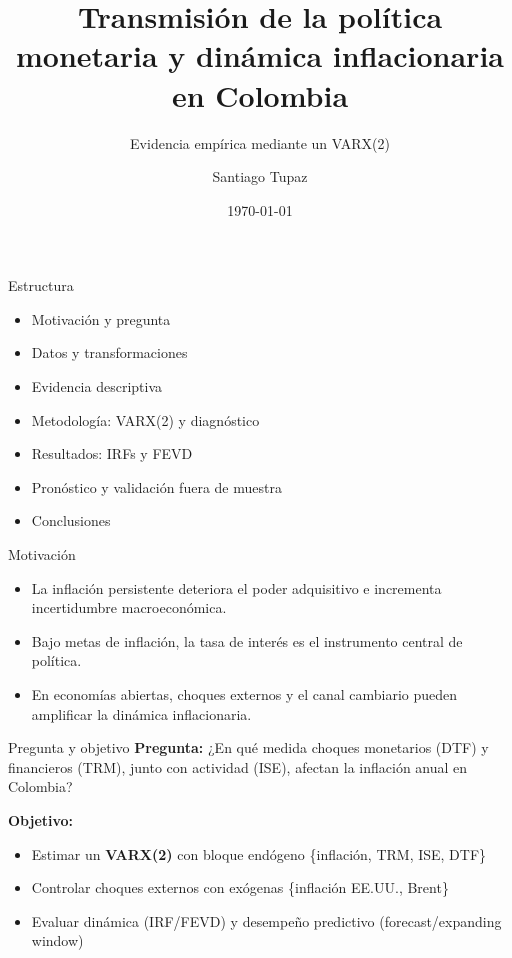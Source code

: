 \documentclass[aspectratio=169,11pt]{beamer}
\title{Transmisión de la política monetaria y dinámica inflacionaria en Colombia}
\subtitle{Evidencia empírica mediante un VARX(2)}
\author{Santiago Tupaz}
\date{\today}
\begin{document}
\begin{frame}
  \titlepage
\end{frame}

\begin{frame}{Estructura}
\begin{itemize}
  \item Motivación y pregunta
  \item Datos y transformaciones
  \item Evidencia descriptiva
  \item Metodología: VARX(2) y diagnóstico
  \item Resultados: IRFs y FEVD
  \item Pronóstico y validación fuera de muestra
  \item Conclusiones
\end{itemize}
\end{frame}

\begin{frame}{Motivación}
\begin{itemize}
  \item La inflación persistente deteriora el poder adquisitivo e incrementa incertidumbre macroeconómica.
  \item Bajo metas de inflación, la tasa de interés es el instrumento central de política.
  \item En economías abiertas, choques externos y el canal cambiario pueden amplificar la dinámica inflacionaria.
\end{itemize}
\end{frame}

\begin{frame}{Pregunta y objetivo}
\textbf{Pregunta:} ¿En qué medida choques monetarios (DTF) y financieros (TRM), junto con actividad (ISE), afectan la inflación anual en Colombia?

\vspace{8pt}
\textbf{Objetivo:}
\begin{itemize}
  \item Estimar un \textbf{VARX(2)} con bloque endógeno \{inflación, TRM, ISE, DTF\}
  \item Controlar choques externos con exógenas \{inflación EE.UU., Brent\}
  \item Evaluar dinámica (IRF/FEVD) y desempeño predictivo (forecast/expanding window)
\end{itemize}
\end{frame}
\end{document}
